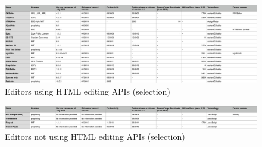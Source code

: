\begin{landscape}

  \begin{figure}[htb]
    \centerline{\includegraphics[width=\linewidth]{images/table-ce-editors.png}}
    \caption{Editors using HTML editing APIs (selection)}
    \label{fig:editors_editing_apis_table}
  \end{figure}
  
  \begin{figure}[htb]
    \centerline{\includegraphics[width=\linewidth]{images/table-js-editors.png}}
    \caption{Editors not using HTML editing APIs (selection)}
    \label{fig:editors_not_editing_apis_table}
  \end{figure}
  
\end{landscape}


\clearpage
\newpage
